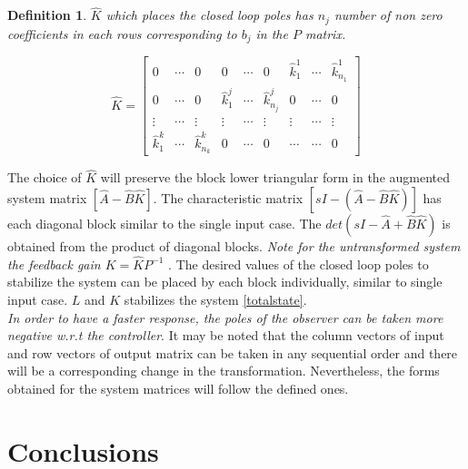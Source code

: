 \documentclass{elsarticle}
\newtheorem{Definition}{Definition}
\numberwithin{equation}{section}
\begin{document}
\begin{Definition}

$\widehat{K}$ which places the closed loop poles has $n_j$ number of non zero coefficients in each rows corresponding to $b_j$ in the $P$ matrix. 

\begin{equation}\label{eq:m8}
	\widehat{K} = \begin{bmatrix} 
	0 &\cdots & 0 & 0 &\cdots & 0 &\widehat{k}_{1}^1 &\cdots &\widehat{k}_{n_{1}}^1 \\
	0 &\cdots & 0 &\widehat{k}_{1}^j &\cdots &\widehat{k}_{n_{j}}^j & 0 &\cdots & 0 \\
	\vdots &\cdots &\vdots &\vdots &\cdots &\vdots &\vdots &\cdots &\vdots \\
	\widehat{k}_{1}^k &\cdots& \widehat{k}_{n_{k}}^k &0 &\cdots & 0 &\cdots &\cdots & 0
	\end{bmatrix}	
\end{equation}
\end{Definition}

The choice of $\widehat{K}$ will preserve the block lower triangular form in the augmented system matrix $[\widehat{A} - \widehat{B} \widehat{K}]$. The characteristic matrix $\left[ sI-\left( \widehat{A} - \widehat{B} \widehat{K} \right) \right] $ has each diagonal block similar to the single input case. The $det(sI-\widehat{A} + \widehat{B} \widehat{K})$ is obtained from the product of diagonal blocks. \textit{Note for the untransformed system the feedback gain $K =  \widehat{K} P^{-1}$ }. The desired values of the closed loop poles to stabilize the system can be placed by each block individually, similar to single input case. $L$ and $K$ stabilizes the system \eqref{totalstate}. \\

\textit{In order to have a faster response, the poles of the observer can be taken more negative w.r.t the controller}. It may be noted that the column vectors of input and row vectors of output matrix can be taken in any sequential order and there will be a corresponding change in the transformation. Nevertheless, the forms obtained for the system matrices will follow the defined ones. 

\section{Conclusions}
\end{document}
